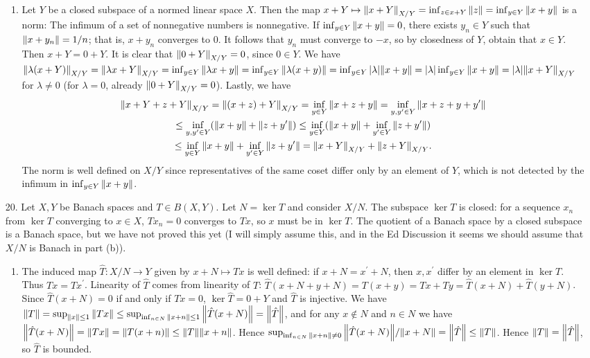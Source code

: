 \documentclass[11pt,leqno]{article}
\theoremstyle{plain}
\theoremstyle{definition}
\numberwithin{equation}{section}
\numberwithin{lem}{section}
\begin{document}
\begin{enumerate}
\begin{enumerate}
    \item Let $Y$ be a closed subspace of a normed linear space $X$. Then the map $x+Y\mapsto \norm{x+Y}_{X/Y} = \inf_{z\in x+Y}\norm{z} = \inf_{y\in Y}\norm{x+y}$ is a norm: The infimum of a set of nonnegative numbers is nonnegative. If $\inf_{y\in Y}\norm{x+y}=0$, there exists $y_n \in Y$ such that $\norm{x+y_n} = 1/n$; that is, $x+y_n$ converges to $0$. It follows that $y_n$ must converge to $-x$, so by closedness of $Y$, obtain that $x\in Y$. Then $x +Y = 0+Y$. It is clear that $\norm{0+Y}_{X/Y} = 0$, since $0\in Y$. We have $\norm{\lambda(x+Y)}_{X/Y} = \norm{\lambda x + Y}_{X/Y} = \inf_{y\in Y}\norm{\lambda x+y} = \inf_{y\in Y}\norm{\lambda(x+y)} = \inf_{y\in Y}\abs{\lambda}\norm{x+y} = \abs{\lambda}\inf_{y\in Y}\norm{x+y} =\abs{\lambda}\norm{x+ Y}_{X/Y}$ for $\lambda \neq 0$ (for $\lambda = 0$, already $\norm{0+Y}_{X/Y} = 0$). Lastly, we have \begin{multline*}
      \norm{x+Y + z+Y}_{X/Y} = \norm{(x+z)+Y}_{X/Y} = \inf_{y\in Y}\norm{x+z+y} = \inf_{y,y^\prime\in Y}\norm{x+z+y + y^\prime}\\\leq \inf_{y,y^\prime\in Y}(\norm{x+y} + \norm{z+y^\prime})\leq \inf_{y\in Y}(\norm{x+y} +\inf_{y^\prime\in Y}\norm{z+y^\prime})\\\leq \inf_{y\in Y}\norm{x+y}+\inf_{y^\prime\in Y}\norm{z+y^\prime} = \norm{x+Y}_{X/Y} + \norm{z+Y}_{X/Y}.
    \end{multline*} The norm is well defined on $X/Y$ since representatives of the same coset differ only by an element of $Y$, which is not detected by the infimum in $\inf_{y\in Y}\norm{x+y}$.
  \end{enumerate}
  
  \item[20.] Let $X,Y$ be Banach spaces and $T\in B(X,Y)$. Let $N = \ker T$ and consider $X/N$. The subspace $\ker T$ is closed: for a sequence $x_n$ from $\ker T$ converging to $x\in X$, $Tx_n = 0$ converges to $Tx$, so $x$ must be in $\ker T$. The quotient of a Banach space by a closed subspace is a Banach space, but we have not proved this yet (I will simply assume this, and in the Ed Discussion it seems we should assume that $X/N$ is Banach in part (b)).
  \begin{enumerate}
    \item The induced map $\hat T\colon X/N\to Y$ given by $x + N\mapsto Tx$ is well defined: if $x+N =  x^\prime + N$, then $x,x^\prime$ differ by an element in $\ker T$. Thus $Tx = Tx^\prime$. Linearity of $\hat T$ comes from linearity of $T$: $\hat T(x + N + y+ N) = T(x+y) = Tx +Ty = \hat T(x+N) + \hat T(y+N)$. Since $\hat T(x+N) = 0$ if and only if $Tx = 0$, $\ker \hat T = 0 + Y$ and $\hat T$ is injective. We have $\norm{T} = \sup_{\norm{x}\leq 1}\norm{Tx}\leq \sup_{\inf_{n\in N}\norm{x+n}\leq 1}\norm{\hat T(x+N)} = \norm{\hat T}$, and for any $x\not \in N$ and $n\in N$ we have $\norm{\hat T(x+N)} = \norm{Tx} = \norm{T(x+n)}\leq \norm{T}\norm{x+n}$. Hence $\sup_{\inf_{n\in N}\norm{x+n}\neq 0}\norm{\hat T(x+N)}/\norm{x+N} = \norm{\hat T}\leq \norm{T}$. Hence $\norm{T} = \norm{\hat T}$, so $\hat T$ is bounded.
    

\end{enumerate}
\end{enumerate}
\end{document}
